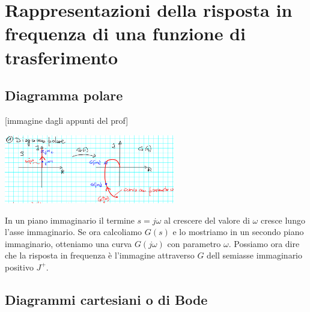 \section{Rappresentazioni della risposta in frequenza di una funzione di trasferimento}
\subsection{Diagramma polare}
[immagine dagli appunti del prof]
\begin{center}
    \includegraphics[height=3cm]{../lezione12/img1.PNG}
\end{center}
In un piano immaginario il termine $s = j \omega$ al crescere del valore di $\omega$ cresce lungo l'asse immaginario. Se ora calcoliamo $G(s)$ e lo mostriamo in un secondo piano immaginario, otteniamo una curva $
G(j \omega)$ con parametro $\omega$.\newline
\newline
Possiamo ora dire che la risposta in frequenza è l'immagine attraverso $G$ dell semiasse immaginario positivo $J^+$.
\subsection{Diagrammi cartesiani o di Bode}
